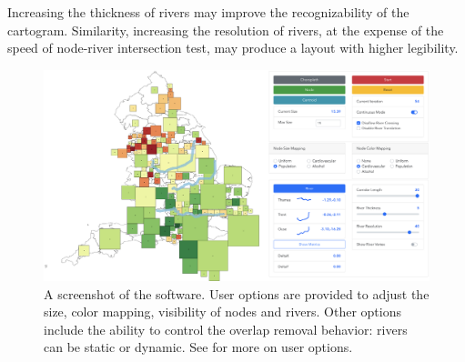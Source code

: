  Increasing the thickness of rivers may improve the recognizability of the cartogram. Similarity, increasing the resolution of rivers, at the expense of the speed of node-river intersection test, may produce a layout with higher legibility.

{
\begin{figure}[tb!]
    \centering
    \includegraphics[width=\textwidth,keepaspectratio]{figure/UI.png}
    \caption{A screenshot of the software. User options are provided to adjust the size, color mapping, visibility of nodes and rivers. Other options include the ability to control the overlap removal behavior: rivers can be static or dynamic. See  for more on user options.}
    \label{fig:overview}
\end{figure}
}